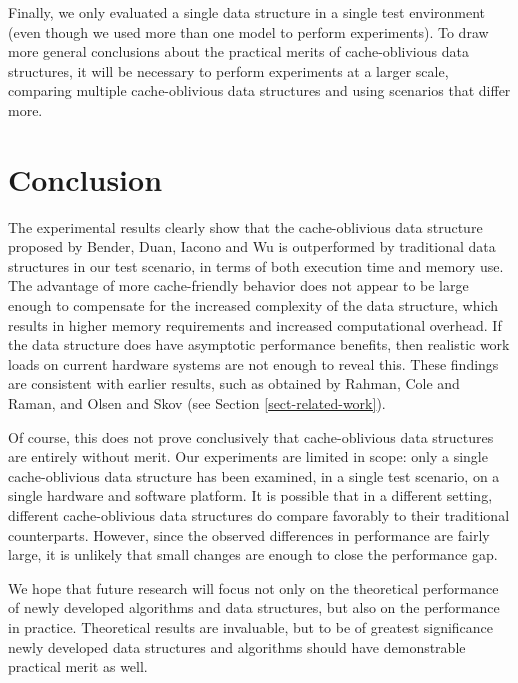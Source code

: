 \documentclass{acm_proc_article-sp}
\begin{document}
Finally, we only evaluated a single data structure in a single test
environment (even though we used more than one model to perform experiments).
To draw more general conclusions about the practical merits of cache-oblivious
data structures, it will be necessary to perform experiments at a larger scale,
comparing multiple cache-oblivious data structures and using scenarios that
differ more.

\section{Conclusion}
The experimental results clearly show that the cache-oblivious data structure
proposed by Bender, Duan, Iacono and Wu is outperformed by traditional data
structures in our test scenario, in terms of both execution time and memory use.
The advantage of more cache-friendly behavior does not appear to be large enough
to compensate for the increased complexity of the data structure, which results in
higher memory requirements and increased computational overhead.
If the data structure does have asymptotic performance benefits, then realistic
work loads on current hardware systems are not enough to reveal this.
These findings are consistent with earlier results, such as obtained by
Rahman, Cole and Raman, and Olsen and Skov (see Section \ref{sect-related-work}).

Of course, this does not prove conclusively that cache-oblivious data structures
are entirely without merit. Our experiments are limited in scope: only a single
cache-oblivious data structure has been examined, in a single test scenario,
on a single hardware
and software platform.
It is possible that in a different setting, different cache-oblivious data
structures do compare favorably to their traditional counterparts.
However, since the observed differences in performance are fairly large,
it is unlikely that small changes are enough to close the performance gap.

We hope that future research will focus not only on the theoretical performance
of newly developed algorithms and data structures, but also on the performance
in practice. Theoretical results are invaluable, but to be of greatest
significance newly developed data structures and algorithms should have
demonstrable practical merit as well.




\end{document}

